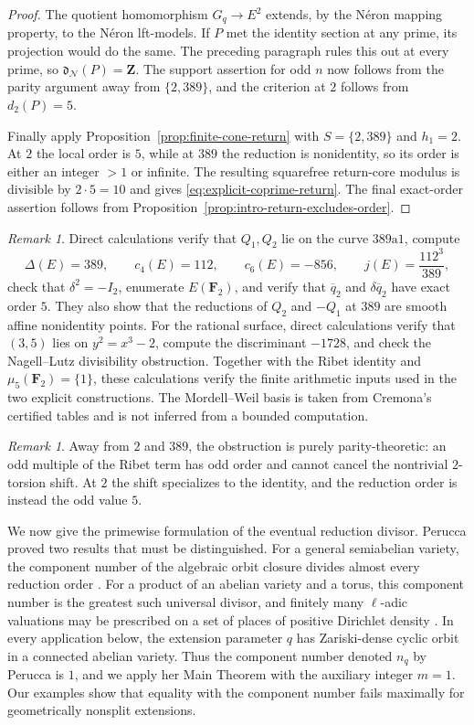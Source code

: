 \documentclass[11pt,letterpaper,reqno]{amsart}
\theoremstyle{definition}
\theoremstyle{remark}
\newtheorem{remark}[theorem]{Remark}
\newcommand{\Z}{\mathbf Z}
\newcommand{\dd}{\mathfrak d}
\newcommand{\Ner}{\mathcal N}
\begin{document}
\begin{proof}
The quotient homomorphism $G_q\to E^2$ extends, by the N\'eron mapping
property, to the N\'eron lft-models.  If $P$ met the identity section at any
prime, its projection would do the same.  The preceding paragraph rules this
out at every prime, so $\dd_{\Ner}(P)=\Z$.  The support assertion for odd $n$
now follows from the parity argument away from $\{2,389\}$, and the criterion
at $2$ follows from $d_2(P)=5$.

Finally apply Proposition~\ref{prop:finite-cone-return} with $S=\{2,389\}$ and
$h_1=2$.  At $2$ the local order is $5$, while at $389$ the reduction is
nonidentity, so its order is either an integer $>1$ or infinite.  The resulting
squarefree return-core modulus is divisible by $2\cdot5=10$ and gives
\eqref{eq:explicit-coprime-return}.  The final exact-order assertion follows
from Proposition~\ref{prop:intro-return-excludes-order}.
\end{proof}

\begin{remark}
Direct calculations verify that $Q_1,Q_2$ lie on the curve
$389\mathrm a1$, compute
\[
 \Delta(E)=389,
 \qquad c_4(E)=112,
 \qquad c_6(E)=-856,
 \qquad j(E)=\frac{112^3}{389},
\]
check that $\delta^2=-I_2$, enumerate $E(\mathbf F_2)$, and verify that
$\overline q_2$ and $\delta\overline q_2$ have exact order $5$.  They also
show that the reductions of $Q_2$ and $-Q_1$ at $389$ are smooth affine
nonidentity points.  For the rational surface, direct calculations verify that
$(3,5)$ lies on $y^2=x^3-2$, compute the discriminant $-1728$, and check the
Nagell--Lutz divisibility obstruction.  Together with the Ribet identity and
$\mu_5(\mathbf F_2)=\{1\}$, these calculations verify the finite arithmetic
inputs used in the two explicit constructions.  The Mordell--Weil basis is
taken from Cremona's certified tables and is not inferred from a bounded
computation.
\end{remark}

\begin{remark}
Away from $2$ and $389$, the obstruction is purely parity-theoretic: an odd
multiple of the Ribet term has odd order and cannot cancel the nontrivial
$2$-torsion shift.  At $2$ the shift specializes to the identity, and the
reduction order is instead the odd value $5$.
\end{remark}

We now give the primewise formulation of the eventual reduction divisor. Perucca proved two results that must be distinguished.  For a general
semiabelian variety, the component number of the algebraic orbit closure
divides almost every reduction order \cite[Proposition~2.2]{Perucca2009}.  For
a product of an abelian variety and a torus, this component number is the
greatest such universal divisor, and finitely many $\ell$-adic valuations may
be prescribed on a set of places of positive Dirichlet density
\cite[Main Theorem~1]{Perucca2009}.  In every application below, the
extension parameter $q$ has Zariski-dense cyclic orbit in a connected abelian
variety.  Thus the component number denoted $n_q$ by Perucca is $1$, and we
apply her Main Theorem with the auxiliary integer $m=1$.  Our examples show
that equality with the component number fails maximally for geometrically
nonsplit extensions.
\end{document}
